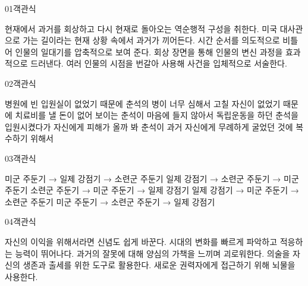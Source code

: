\documentclass[fs9,seriesRus]{korfarm-base}
\begin{document}

\par\medskip
\kfBeginMC
\begin{kfQBlock}{01}{객관식}
\begin{kfChoices}
\kfChoice 현재에서 과거를 회상하고 다시 현재로 돌아오는 역순행적 구성을 취한다.
\kfChoice 미국 대사관으로 가는 길이라는 현재 상황 속에서 과거가 끼어든다.
\kfChoice 시간 순서를 의도적으로 비틀어 인물의 일대기를 압축적으로 보여 준다.
\kfChoice 회상 장면을 통해 인물의 변신 과정을 효과적으로 드러낸다.
\kfChoice 여러 인물의 시점을 번갈아 사용해 사건을 입체적으로 서술한다.
\end{kfChoices}
\end{kfQBlock}
\begin{kfQBlock}{02}{객관식}
\begin{kfChoices}
\kfChoice 병원에 빈 입원실이 없었기 때문에
\kfChoice 춘석의 병이 너무 심해서 고칠 자신이 없었기 때문에
\kfChoice 치료비를 낼 돈이 없어 보이는 춘석이 마음에 들지 않아서
\kfChoice 독립운동을 하던 춘석을 입원시켰다가 자신에게 피해가 올까 봐
\kfChoice 춘석이 과거 자신에게 무례하게 굴었던 것에 복수하기 위해서
\end{kfChoices}
\end{kfQBlock}
\begin{kfQBlock}{03}{객관식}
\begin{kfChoices}
\kfChoice 미군 주둔기 → 일제 강점기 → 소련군 주둔기
\kfChoice 일제 강점기 → 소련군 주둔기 → 미군 주둔기
\kfChoice 소련군 주둔기 → 미군 주둔기 → 일제 강점기
\kfChoice 일제 강점기 → 미군 주둔기 → 소련군 주둔기
\kfChoice 미군 주둔기 → 소련군 주둔기 → 일제 강점기
\end{kfChoices}
\end{kfQBlock}
\begin{kfQBlock}{04}{객관식}
\begin{kfChoices}
\kfChoice 자신의 이익을 위해서라면 신념도 쉽게 바꾼다.
\kfChoice 시대의 변화를 빠르게 파악하고 적응하는 능력이 뛰어나다.
\kfChoice 과거의 잘못에 대해 양심의 가책을 느끼며 괴로워한다.
\kfChoice 의술을 자신의 생존과 출세를 위한 도구로 활용한다.
\kfChoice 새로운 권력자에게 접근하기 위해 뇌물을 사용한다.
\end{kfChoices}
\end{kfQBlock}
\end{document}
